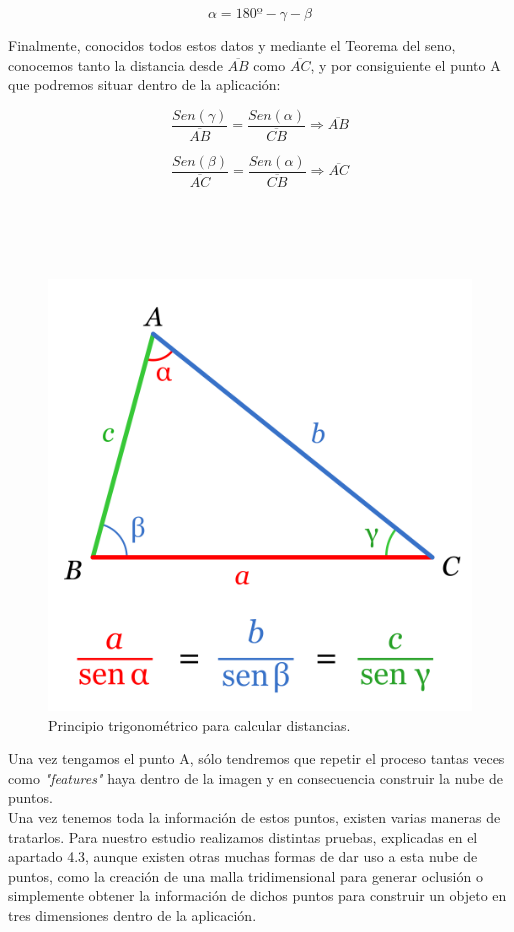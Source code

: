 $$\alpha=180º-\gamma-\beta$$

Finalmente, conocidos todos estos datos y mediante el Teorema del seno, conocemos tanto la distancia desde $\overline{AB}$ como $\overline{AC}$, y por consiguiente el punto A que podremos situar dentro de la aplicación:

$$\frac{Sen(\gamma)}{\overline{AB}}=\frac{Sen(\alpha)}{\overline{CB}} \Rightarrow \overline{AB} $$ 

$$\frac{Sen(\beta)}{\overline{AC}}=\frac{Sen(\alpha)}{\overline{CB}} \Rightarrow \overline{AC} $$ \\ \\ \\ \\

\begin{figure}[h]
    \centering
    \includegraphics[scale=0.15]{Images/NubeDePuntos/Trigonometria.png}
    \caption[Principio trigonométrico para calcular distancias]{Principio trigonométrico para calcular distancias.}
    \label{fig:Trigonometry}
\end{figure}

Una vez tengamos el punto A, sólo tendremos que repetir el proceso tantas veces como \textit{"features"} haya dentro de la imagen y en consecuencia construir la nube de puntos. \\

Una vez tenemos toda la información de estos puntos, existen varias maneras de tratarlos. Para nuestro estudio realizamos distintas pruebas, explicadas en el apartado 4.3, aunque existen otras muchas formas de dar uso a esta nube de puntos, como la creación de una malla tridimensional para generar oclusión o simplemente obtener la información de dichos puntos para construir un objeto en tres dimensiones dentro de la aplicación.